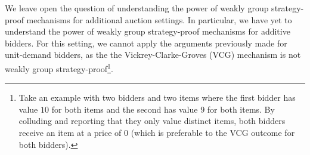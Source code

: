 We leave open the question of understanding the power of weakly group strategy-proof mechanisms for additional auction settings. In particular, we have yet to understand the power of weakly group strategy-proof mechanisms for additive bidders.  
For this setting, we cannot apply the arguments previously made for unit-demand bidders, as the the Vickrey-Clarke-Groves (VCG) mechanism 
is not weakly group strategy-proof\footnote{Take an example with two bidders and two items where the first bidder has value $10$ for both items and the second has value $9$ for both items.  By colluding and reporting that they only value distinct items, both bidders receive an item at a price of $0$ (which is preferable to the VCG outcome for both bidders).}. 

  

